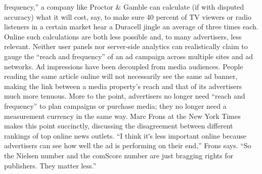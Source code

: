 frequency,'' a company like Proctor & Gamble can calculate (if with
disputed accuracy) what it will cost, say, to make sure 40 percent of TV
viewers or radio listeners in a certain market hear a Duracell jingle an
average of three times each.
Online such calculations are both less possible and, to many advertisers,
less relevant. Neither user panels nor server‐side analytics can realistically
claim to gauge the ``reach and frequency'' of an ad campaign across
multiple sites and ad networks. Ad impressions have been decoupled
from media audiences. People reading the same article online will not
necessarily see the same ad banner, making the link between a media
property’s reach and that of its advertisers much more tenuous. More to
the point, advertisers no longer need ``reach and frequency'' to plan
campaigns or purchase media; they no longer need a measurement
currency in the same way.
Marc Frons at the New York Times makes this point succinctly, discussing
the disagreement between different rankings of top online news outlets. ``I
think itʹs less important online because advertisers can see how well the
ad is performing on their end,'' Frons says. ``So the Nielsen number and
the comScore number are just bragging rights for publishers. They matter
less.''
